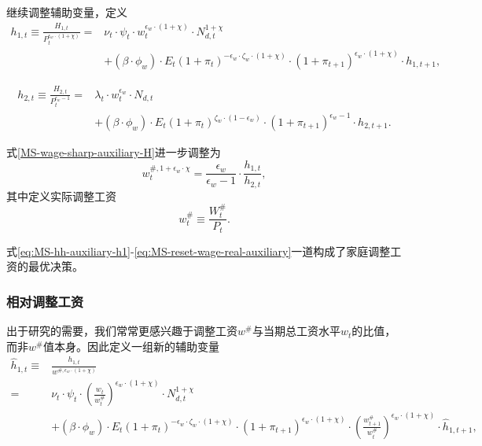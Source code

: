继续调整辅助变量，定义
\begin{equation}
\label{eq:MS-hh-auxiliary-h1}
\begin{split}
h_{1,t} \equiv \frac{H_{1,t}}{P_t^{\epsilon_w \cdot \left( 1+\chi \right)}} = & \nu_t \cdot \psi_t \cdot w_t^{\epsilon_w \cdot \left(1+\chi \right)} \cdot N_{d,t}^{1+\chi} \\
&+ \left(\beta \cdot \phi_w \right) \cdot E_t \left( 1+\pi_t \right)^{-\epsilon_w \cdot \zeta_w \cdot (1+\chi)} \cdot \left(1+\pi_{t+1} \right)^{\epsilon_w \cdot \left(1+\chi \right)}\cdot h_{1,t+1},
\end{split}
\end{equation}

\begin{equation}
\label{eq:MS-hh-auxiliary-h2}
\begin{split}
h_{2,t} \equiv \frac{H_{2,t}}{P_t^{\epsilon_w - 1}} =& \lambda_t \cdot w_t^{\epsilon_w} \cdot N_{d,t} \\
&+ \left(\beta \cdot \phi_w \right) \cdot E_t \left( 1+\pi_t \right)^{\zeta_w \cdot (1-\epsilon_w)} \cdot \left(1 + \pi_{t+1} \right)^{\epsilon_w -1}\cdot h_{2,t+1}.
\end{split}
\end{equation}

式\eqref{MS-wage-sharp-auxiliary-H}进一步调整为
\begin{equation}
\label{eq:MS-reset-wage-real-auxiliary}
w_t^{\#, 1+\epsilon_w \cdot \chi} = \frac{\epsilon_w}{\epsilon_w -1} \cdot \frac{h_{1,t}}{h_{2,t}},
\end{equation}
其中定义实际调整工资
\begin{equation}
\label{eq:MS-reset-wage-real}
w_t^{\#} \equiv \frac{W_t^{\#}}{P_t}.
\end{equation}

式\eqref{eq:MS-hh-auxiliary-h1}-\eqref{eq:MS-reset-wage-real-auxiliary}一道构成了家庭调整工资的最优决策。

\subsubsection{相对调整工资}
出于研究的需要，我们常常更感兴趣于调整工资$w^{\#}$与当期总工资水平$w_t$的比值，而非$w^{\#}$值本身。因此定义一组新的辅助变量
\begin{equation}
\label{eq:MS-hh-auxiliary-hat-h1}
\begin{split}
\hat{h}_{1,t} \equiv& \frac{h_{1,t}}{w^{\#, \epsilon_w \cdot \left(1+\chi \right)}} \\
=& \nu_t \cdot \psi_t \cdot \left(\frac{w_t}{w_t^{\#}}\right)^{\epsilon_w \cdot \left(1+\chi \right)} \cdot N_{d,t}^{1+\chi} \\
&+ \left(\beta \cdot \phi_w \right) \cdot E_t \left( 1+\pi_t \right)^{-\epsilon_w \cdot \zeta_w \cdot (1+\chi)} \cdot \left(1+\pi_{t+1} \right)^{\epsilon_w \cdot \left(1+\chi \right)}\cdot \left(\frac{w^{\#}_{t+1}}{w^{\#}_{t}}\right)^{\epsilon_w \cdot \left( 1 + \chi \right)} \cdot \hat{h}_{1,t+1},
\end{split}
\end{equation}

